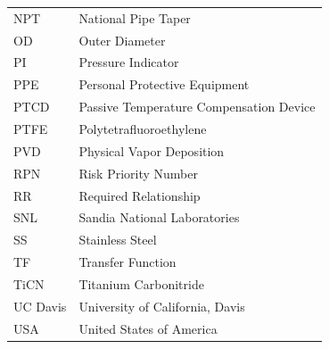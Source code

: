 \documentclass[12pt, letterpaper]{report}%
\newcounter{mycounter}           %
\newcounter{sub}[mycounter]      %
\begin{document}
\begin{longtable}{@{} l p{} @{}}
		NPT			& National Pipe Taper \\
		OD			& Outer Diameter \\
		PI			& Pressure Indicator \\
		PPE			& Personal Protective Equipment \\
		PTCD    & Passive Temperature Compensation Device \\
		PTFE		& Polytetrafluoroethylene \\ 
		PVD			& Physical Vapor Deposition \\
		RPN			& Risk Priority Number \\
		RR      & Required Relationship \\
		SNL     & Sandia National Laboratories \\
		SS			& Stainless Steel \\
		TF      & Transfer Function \\
		TiCN		& Titanium Carbonitride \\
		UC Davis & University of California, Davis \\
		USA			& United States of America \\
	\end{longtable}

\newpage  %


\begin{abstract}

	Modern engineering constantly requires advances in technological precision and reliability.
	Sandia National Laboratories, a United States security and energy research facility, conducts many experiments that depend on submillimeter-precision flow control of high-pressure hydrogen gas.
	Their test articles are sensitive to temperature fluctuations; the flow must be adjusted to compensate for these changes.
	However, power and space constraints prohibit the use of embedded control systems, and existing passive flow control solutions do not approach the size and precision these experiments require.
	
	Sandia commissioned the Noble Aggie Labs from the University of California, Davis to design and prototype a proof-of-concept Passive Temperature Compensation Device (PTCD)
	that thermomechanically adjusts gas flow according to the ambient air temperature.
	Engineered to contain and restrict hydrogen or a noble gas at up to 700 times atmospheric pressure,
	the PTCD maintains a pin-sized orifice with microscopic precision. 
	It does so with a novel square-orifice valve architecture that is driven by an external, bimetallic actuator.

	This report details the design objectives, the final selected architecture, the analytical and numerical verification of system requirement satisfaction,
	and a full design package required for further iteration.

\end{abstract}
\end{document}

